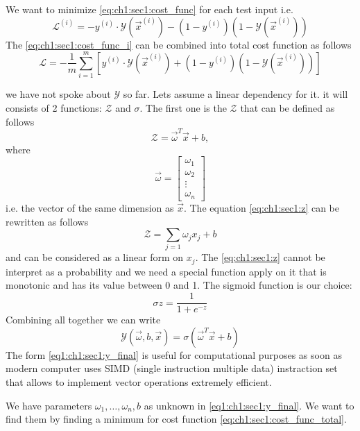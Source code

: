 We want to minimize \cref{eq:ch1:sec1:cost_func} for each test input i.e.
\begin{equation}
  \mathcal{L}^{(i)} = - y^{(i)} \cdot \mathcal{Y}\left(\vec{x}^{(i)}\right) -
(1-y^{(i)}) \left(1 - \mathcal{Y}\left(\vec{x}^{(i)}\right)\right)
  \label{eq:ch1:sec1:cost_func_i}
\end{equation}
The \cref{eq:ch1:sec1:cost_func_i} can be combined into total cost function as
follows
\begin{equation}
  \mathcal{L} = - \frac{1}{m} \sum_{i = 1}^{m} \left[ y^{(i)} \cdot \mathcal{Y}\left(\vec{x}^{(i)}\right) +
(1-y^{(i)}) \left(1 - \mathcal{Y}\left(\vec{x}^{(i)}\right)\right)\right]
  \label{eq:ch1:sec1:cost_func_total}
\end{equation}

we have not spoke about $\mathcal{Y}$ so far. Lets assume a linear dependency
for it. it will consists of 2 functions: $\mathcal{Z}$ and $\sigma$. The first
one is the $\mathcal{Z}$ that can be defined as follows
\begin{equation}
  \mathcal{Z} = \vec{\omega}^T \vec{x} + b,
  \label{eq:ch1:sec1:z}
\end{equation}
where
\[
\vec{\omega} =
\begin{bmatrix}
  \omega_{1} \\
  \omega_{2} \\
  \vdots \\
  \omega_{n}
\end{bmatrix}
\]
i.e. the vector of the same dimension as $\vec{x}$.
The equation \cref{eq:ch1:sec1:z} can be rewritten as follows
\[
\mathcal{Z} = \sum_{j = 1} \omega_j x_j +b
\]
and can be considered as a linear form on ${x_j}$. The \cref{eq:ch1:sec1:z}
cannot be interpret as a probability and we need a special function apply on it
that is monotonic and has its value between 0 and 1. The sigmoid function is our
choice:
\[
\sigma{z} = \frac{1}{1+e^{-z}}
\]
Combining all together we can write
\begin{equation}
  \mathcal{Y}\left(\vec{\omega}, b, \vec{x}\right) =
  \sigma\left(\vec{\omega}^T \vec{x} + b\right)
  \label{eq1:ch1:sec1:y_final}
\end{equation}
The form \cref{eq1:ch1:sec1:y_final} is useful for computational purposes as
soon as modern computer uses SIMD (single instruction multiple data) instraction
set that allows to implement vector operations extremely efficient.

We have parameters $\omega_1, \dots, \omega_n, b$ as unknown in
\cref{eq1:ch1:sec1:y_final}. We want to find them by finding a minimum for cost
function \cref{eq:ch1:sec1:cost_func_total}.

